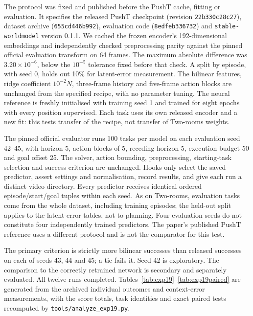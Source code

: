 \documentclass[11pt,a4paper]{article}
\begin{document}
The protocol was fixed and published before the PushT cache, fitting or evaluation. It specifies the released PushT checkpoint (revision \texttt{22b330c28c27}), dataset archive (\texttt{655cd446b992}), evaluation code (\texttt{8edfeb336732}) and \texttt{stable-worldmodel} version 0.1.1. We cached the frozen encoder's 192-dimensional embeddings and independently checked preprocessing parity against the pinned official evaluation transform on 64 frames. The maximum absolute difference was $3.20\times10^{-6}$, below the $10^{-5}$ tolerance fixed before that check. A split by episode, with seed 0, holds out 10\% for latent-error measurement. The bilinear features, ridge coefficient $10^{-2}N$, three-frame history and five-frame action blocks are unchanged from the specified recipe, with no parameter tuning. The neural reference is freshly initialised with training seed 1 and trained for eight epochs with every position supervised. Each task uses its own released encoder and a new fit: this tests transfer of the recipe, not transfer of Two-rooms weights.

The pinned official evaluator runs 100 tasks per model on each evaluation seed 42--45, with horizon 5, action blocks of 5, receding horizon 5, execution budget 50 and goal offset 25. The solver, action bounding, preprocessing, starting-task selection and success criterion are unchanged. Hooks only select the saved predictor, assert settings and normalisation, record results, and give each run a distinct video directory. Every predictor receives identical ordered episode/start/goal tuples within each seed. As on Two-rooms, evaluation tasks come from the whole dataset, including training episodes; the held-out split applies to the latent-error tables, not to planning. Four evaluation seeds do not constitute four independently trained predictors. The paper's published PushT reference uses a different protocol and is not the comparator for this test.

The primary criterion is strictly more bilinear successes than released successes on each of seeds 43, 44 and 45; a tie fails it. Seed 42 is exploratory. The comparison to the correctly retrained network is secondary and separately evaluated. All twelve runs completed. Tables~\ref{tab:exp19}--\ref{tab:exp19paired} are generated from the archived individual outcomes and context-error measurements, with the score totals, task identities and exact paired tests recomputed by \texttt{tools/analyze\_exp19.py}.


\end{document}

